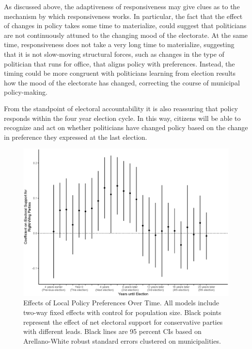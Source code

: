 \documentclass[a4paper,12pt]{article}
\begin{document}
As discussed above, the adaptiveness of responsiveness may give clues as to the mechanism by which responsiveness works. In particular, the fact that the effect of changes in policy takes some time to materialize, could suggest that politicians are not continuously  attuned to the changing mood of the electorate. At the same time, responsiveness does not take a very long time to materialize, suggesting that it is not slow-moving structural forces, such as changes in the type of politician that runs for office, that aligns policy with preferences. Instead, the timing could be more congruent with politicians learning from election results how the mood of the electorate has changed, correcting the course of municipal policy-making. 

From the standpoint of electoral accountability it is also reassuring that policy responds within the four year election cycle. In this way, citizens will be able to recognize and act on whether politicians have changed policy based on the change in preference they expressed at the last election. 

\begin{figure}[htbp]
	\centering
	\includegraphics[scale = .65]{dynamics.eps}
	\caption{Effects of Local Policy Preferences Over Time. All models include two-way fixed effects with control for population size. Black points represent the effect of net electoral support for conservative parties with different leads. Black lines are 95 percent CIs based on Arellano-White robust standard errors clustered on municipalities. }
	\label{fig:LongRun}
\end{figure}
\end{document}
